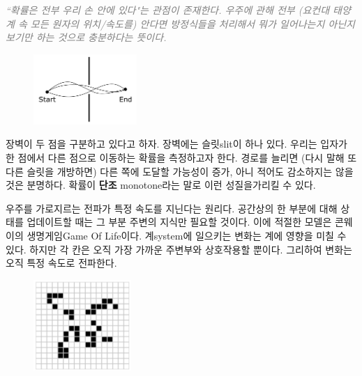 \documentclass[a4paper,chapter,kosection,atbegshi,hidelinks,itemph]{oblivoir}
\begin{document}
\newpage\pagestyle{hf}

\hfill\parbox[t]{9cm}{\textcolor{gray}{\slshape``확률은 전부 우리 손 안에 있다"는
관점이 존재한다. 우주에 관해 전부 (요컨대 태양계 속 모든 원자의 
위치/속도를) 안다면 방정식들을 처리해서 뭐가 일어나는지 아닌지
보기만 하는 것으로 충분하다는 뜻이다.}}\break

\begin{figure}
    \centering
    \includegraphics[width=0.35\textwidth]{iqis1_001}
\end{figure}

\hfill

장벽이 두 점을 구분하고 있다고 하자. 장벽에는 슬릿{\footnotesize slit}이 하나
있다. 우리는 입자가 한 점에서 다른 점으로 이동하는 확률을 측정하고자 한다. 
경로를 늘리면 (다시 말해 또 다른 슬릿을 개방하면) 다른 쪽에 도달할 가능성이 증가, 아니 적어도 감소하지는 않을 것은 분명하다. 확률이 \textbf{단조}{\footnotesize
monotone}라는 말로 이런 성질을가리킬 수 있다.

\hfill
\begin{description}[leftmargin=0cm]
    \item[국소성{\footnotesize Locality}.] 
        우주를 가로지르는 전파가 특정 속도를 지닌다는 원리다.
        공간상의 한 부분에 대해 상태를 업데이트할 때는 그 부분 주변의 지식만
        필요할 것이다. 이에 적절한 모델은 콘웨이의 생명게임{\footnotesize Game Of
        Life}이다. 계{\footnotesize system}에 일으키는 변화는 계에 영향을 미칠
        수 있다. 하지만 각 칸은 오직 가장 가까운 주변부와 상호작용할 뿐이다. 
        그리하여 변화는 오직 특정 속도로 전파한다.
\end{description}

\begin{figure}
    \centering
    \includegraphics[width=0.33\textwidth]{iqis1_002}
\end{figure}
\end{document}
